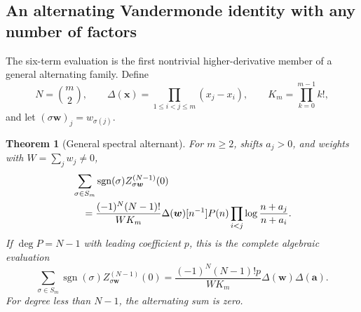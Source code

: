 \documentclass[11pt,letterpaper]{article}
\numberwithin{equation}{section}
\theoremstyle{plain}
\newtheorem{theorem}{Theorem}[section]
\theoremstyle{definition}
\theoremstyle{remark}
\begin{document}
\subsection{An alternating Vandermonde identity with any number of factors}

The six-term evaluation is the first nontrivial higher-derivative member
of a general alternating family. Define
\[
 N=\binom m2,\qquad
 \Delta(\boldsymbol x)=\prod_{1\le i<j\le m}(x_j-x_i),\qquad
 K_m=\prod_{k=0}^{m-1}k!,
\]
and let $(\sigma\boldsymbol w)_j=w_{\sigma(j)}$.

\begin{theorem}[General spectral alternant]\label{sp:thm:alternant}
For $m\ge2$, shifts $a_j>0$, and weights with $W=\sum_jw_j\ne0$,
\begin{align}\label{sp:alternant}
 &\sum_{\sigma\in S_m}\operatorname{sgn}(\sigma)
       Z_{\sigma\boldsymbol w}^{(N-1)}(0)\notag\\
 &\quad=\frac{(-1)^N(N-1)!}{WK_m}\Delta(\boldsymbol w)
     [n^{-1}]P(n)\prod_{i<j}\log\frac{n+a_j}{n+a_i}.
\end{align}
If $\deg P=N-1$ with leading coefficient $p$, this is the complete
algebraic evaluation
\begin{equation}\label{sp:alternant-leading}
 \boxed{\sum_{\sigma\in S_m}\operatorname{sgn}(\sigma)
       Z_{\sigma\boldsymbol w}^{(N-1)}(0)
 =\frac{(-1)^N(N-1)!p}{WK_m}
                 \Delta(\boldsymbol w)\Delta(\boldsymbol a).}
\end{equation}
For degree less than $N-1$, the alternating sum is zero.
\end{theorem}
\end{document}
